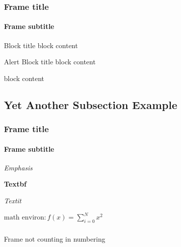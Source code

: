 \begin{frame}
  \frametitle{Frame title}
  \framesubtitle{Frame subtitle}

  \begin{block}{Block title}
    block content
  \end{block}

  \begin{alertblock}{Alert Block title}
    block content
  \end{alertblock}
  
  \begin{example}
    block content
  \end{example}
  
\end{frame}

\subsection[Y. A. Subsection]{Yet Another Subsection Example}
\begin{frame}
  \frametitle{Frame title}
  \framesubtitle{Frame subtitle}

  \emph{Emphasis}

  \vspace{1em}

  \textbf{Textbf}
  
  \vspace{1em}

  \textit{Textit}
  
  \vspace{1em}

  $\text{math environ}: f(x) = \sum_{i=0}^N x^2$

\end{frame}


\begin{frame}[allowframebreaks]
  \frametitle{\bibname}

  \printbibliography
\end{frame}

\begin{frame}
\end{frame}
\begin{frame}
\end{frame}
\begin{frame}
\end{frame}
\begin{frame}
\end{frame}
\begin{frame}
\end{frame}
\begin{frame}
\end{frame}


\begin{frame}[noframenumbering]

  Frame not counting in numbering
\end{frame}
